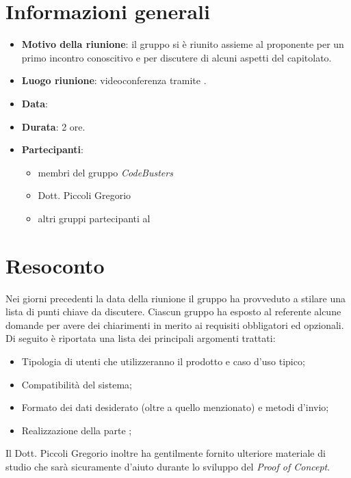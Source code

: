 \section{Informazioni generali}
\begin{itemize}
\item \textbf{Motivo della riunione}: il gruppo si è riunito assieme al proponente per un primo incontro conoscitivo e per discutere di alcuni aspetti del capitolato.
\item \textbf{Luogo riunione}: videoconferenza tramite .
\item \textbf{Data}: \Data{}
\item \textbf{Durata}: 2 ore.
\item \textbf{Partecipanti}:
	\begin{itemize}
	\item membri del gruppo \textit{CodeBusters}
	\item Dott. Piccoli Gregorio
	\item altri gruppi partecipanti al 
	\end{itemize}
\end{itemize}

\section{Resoconto}
Nei giorni precedenti la data della riunione il gruppo ha provveduto a stilare una lista di punti chiave da discutere. Ciascun gruppo ha esposto al referente alcune domande per avere dei chiarimenti in merito ai requisiti obbligatori ed opzionali. Di seguito è riportata una lista dei principali argomenti trattati:
\begin{itemize}

\item Tipologia di utenti che utilizzeranno il prodotto e caso d'uso tipico;

\item Compatibilità del sistema;

\item Formato dei dati desiderato (oltre a quello menzionato) e metodi d'invio;

\item Realizzazione della parte ;

\end{itemize}

Il Dott. Piccoli Gregorio inoltre ha gentilmente fornito ulteriore materiale di studio che sarà sicuramente d'aiuto durante lo sviluppo del \textit{Proof of Concept}.